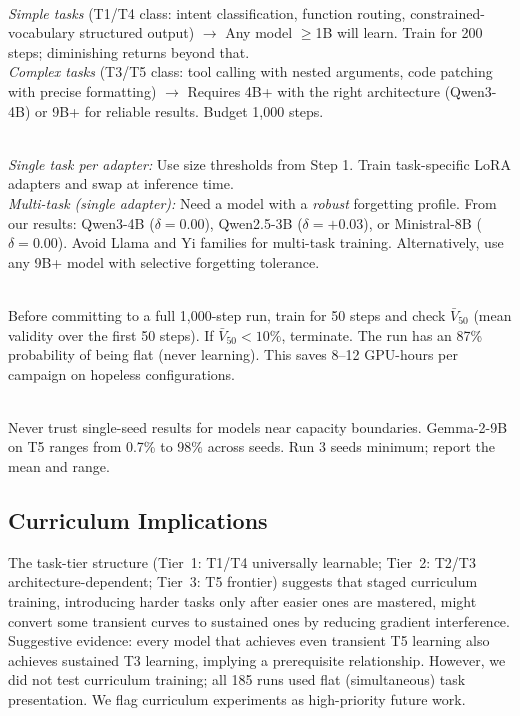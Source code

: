 \documentclass[11pt]{article}
\begin{document}
\begin{description}[leftmargin=*]
\item[Step 1: Classify your task complexity.]~\\
\emph{Simple tasks} (T1/T4 class: intent classification, function routing, constrained-vocabulary structured output) $\to$ Any model $\geq$1B will learn.  Train for 200 steps; diminishing returns beyond that.\\
\emph{Complex tasks} (T3/T5 class: tool calling with nested arguments, code patching with precise formatting) $\to$ Requires 4B+ with the right architecture (Qwen3-4B) or 9B+ for reliable results.  Budget 1{,}000 steps.

\item[Step 2: Determine multi-task requirements.]~\\
\emph{Single task per adapter:} Use size thresholds from Step 1.  Train task-specific LoRA adapters and swap at inference time.\\
\emph{Multi-task (single adapter):} Need a model with a \emph{robust} forgetting profile.  From our results: Qwen3-4B ($\delta = 0.00$), Qwen2.5-3B ($\delta = +0.03$), or Ministral-8B ($\delta = 0.00$).  Avoid Llama and Yi families for multi-task training.  Alternatively, use any 9B+ model with selective forgetting tolerance.

\item[Step 3: Run a 50-step diagnostic.]~\\
Before committing to a full 1{,}000-step run, train for 50 steps and check $\bar{V}_{50}$ (mean validity over the first 50 steps).  If $\bar{V}_{50} < 10\%$, terminate.  The run has an 87\% probability of being flat (never learning).  This saves 8--12 GPU-hours per campaign on hopeless configurations.

\item[Step 4: Validate with 3 seeds.]~\\
Never trust single-seed results for models near capacity boundaries.  Gemma-2-9B on T5 ranges from 0.7\% to 98\% across seeds.  Run 3 seeds minimum; report the mean and range.
\end{description}

\subsection{Curriculum Implications}

The task-tier structure (Tier~1: T1/T4 universally learnable; Tier~2: T2/T3 architecture-dependent; Tier~3: T5 frontier) suggests that staged curriculum training, introducing harder tasks only after easier ones are mastered, might convert some transient curves to sustained ones by reducing gradient interference.  Suggestive evidence: every model that achieves even transient T5 learning also achieves sustained T3 learning, implying a prerequisite relationship.  However, we did not test curriculum training; all 185 runs used flat (simultaneous) task presentation.  We flag curriculum experiments as high-priority future work.
\end{document}
